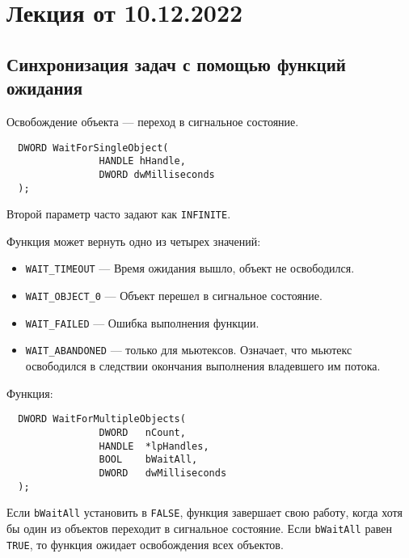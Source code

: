 
\section{Лекция от 10.12.2022}

\subsection{Синхронизация задач с помощью функций ожидания}
Освобождение объекта --- переход в сигнальное состояние.
\begin{verbatim}
  DWORD WaitForSingleObject(
                HANDLE hHandle,
                DWORD dwMilliseconds
  );
\end{verbatim}
Второй параметр часто задают как \verb!INFINITE!.

Функция может вернуть одно из четырех значений:
\begin{itemize}
  \item \verb!WAIT_TIMEOUT! --- Время ожидания вышло, объект не освободился.
  \item \verb!WAIT_OBJECT_0! --- Объект перешел в сигнальное состояние.
  \item \verb!WAIT_FAILED! --- Ошибка выполнения функции.
  \item \verb!WAIT_ABANDONED! --- только для мьютексов. Означает, что мьютекс
    освободился в следствии окончания выполнения владевшего им потока.
\end{itemize}

Функция:
\begin{verbatim}
  DWORD WaitForMultipleObjects(
                DWORD   nCount,
                HANDLE  *lpHandles,
                BOOL    bWaitAll,
                DWORD   dwMilliseconds
  );
\end{verbatim}
Если \verb!bWaitAll! установить в \verb!FALSE!, функция завершает свою работу,
когда хотя бы один из объектов переходит в сигнальное состояние. Если
\verb!bWaitAll! равен \verb!TRUE!, то функция ожидает освобождения всех
объектов.

